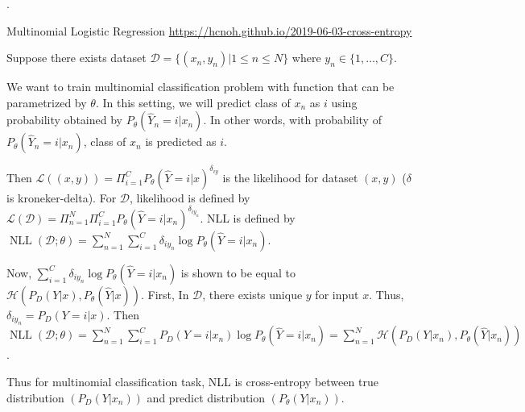 \documentclass[8pt]{beamer}
\newcommand{\mc}[1]{\mathcal{#1}}
\newcommand{\NLL}[1]{\operatorname{NLL}\!\left(#1\right)}
\begin{document}
\begin{frame}{.}
  \begin{block}{Multinomial Logistic Regression}
    \href{https://hcnoh.github.io/2019-06-03-cross-entropy}{https://hcnoh.github.io/2019-06-03-cross-entropy}
    \smallskip

    Suppose there exists dataset $\mc{D} = \{(x_n,y_n)| 1\leq n \leq N\}$ where $y_n \in \{1, \dots, C\}$.

    We want to train multinomial classification problem with function that can be parametrized by $\theta$. 
    In this setting, we will predict class of $x_n$ as $i$ using probability obtained by $P_\theta (\hat{Y}_n = i|x_n)$. 
    In other words, with probability of $P_\theta (\hat{Y}_n = i |x_n)$, class of $x_n$ is predicted as $i$.

    \smallskip
    Then $\mc{L}((x,y)) = \Pi_{i=1}^C P_\theta(\hat{Y}=i|x)^{\delta_{iy}}$ is the likelihood for dataset $(x,y)$ ($\delta$ is kroneker-delta).
    For $\mc{D}$, likelihood is defined by $\mc{L}(\mc{D}) = \Pi_{n=1}^N \Pi_{i=1}^C P_\theta(\hat{Y}=i|x_n)^{\delta_{iy_n}}$. NLL is defined by $\NLL{\mc{D};\theta} = \sum_{n=1}^N \sum_{i=1}^C \delta_{i y_n} \log{P_\theta (\hat{Y}=i | x_n)}$.

    \smallskip
    Now, $\sum_{i=1}^C \delta_{i y_n} \log{P_\theta(\hat{Y}=i| x_n)}$ is shown to be equal to $\mc{H}( P_D(Y|x), P_\theta(\hat{Y}|x))$. First, In $\mc{D}$, there exists unique $y$ for input $x$. Thus, $\delta_{iy_n} = P_D(Y=i|x)$. Then $\NLL{\mc{D};\theta} = \sum_{n=1}^N \sum_{i=1}^C P_D(Y=i| x_n) \log{P_\theta (\hat{Y}=i|x_n)} = \sum_{n=1}^N\mc{H}(P_D(Y|x_n), P_\theta (\hat{Y}|x_n))$.

    \bigskip
    Thus for multinomial classification task, NLL is cross-entropy between true distribution $(P_D(Y|x_n))$ and predict distribution $(P_\theta(Y|x_n))$.

  \end{block}
\end{frame}
\end{document}
